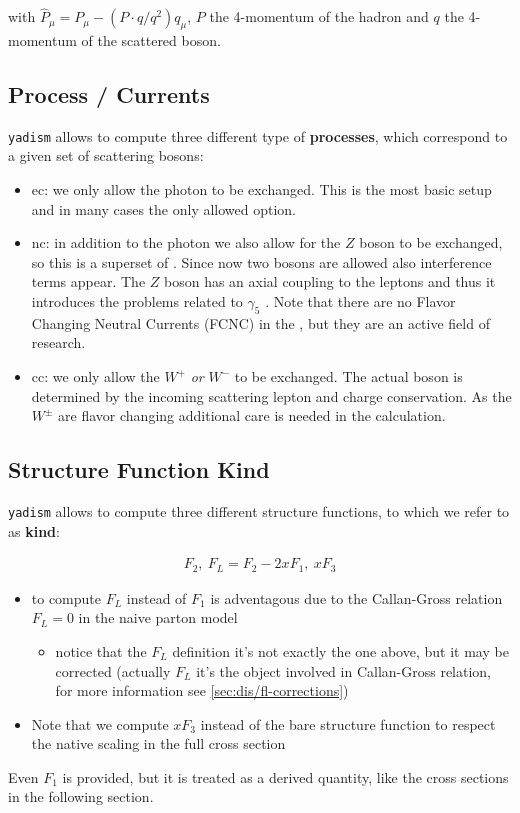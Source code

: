 with $\hat P_\mu = P_\mu - (P\cdot q / q^2) q_\mu$, $P$ the 4-momentum of the
hadron and $q$ the 4-momentum of the scattered boson.

\subsection{Process / Currents}

\texttt{yadism} allows to compute three different type of \textbf{processes}, which correspond to a
given set of scattering bosons:

\begin{itemize}
  \item \acrfull{ec}: we only allow the photon to be exchanged.
    This is the most basic setup and in many cases the only allowed option.
  \item \acrfull{nc}: in addition to the photon we also allow for the
    $Z$ boson to be exchanged, so this is a superset of \ec.
    Since now two bosons are allowed also interference terms appear.
    The $Z$ boson has an axial coupling to the leptons and thus it introduces the
    problems related to $\gamma_5$ \cite{Gnendiger:2017pys}.
    Note that there are no Flavor Changing Neutral Currents (FCNC) in the \sm,
    but they are an active field of research.
  \item \acrfull{cc}: we only allow the $W^+$ \textit{or} $W^-$ to be
    exchanged. The actual boson is determined by the incoming scattering lepton
    and charge conservation. As the $W^\pm$ are flavor changing additional care
    is needed in the calculation.
\end{itemize}


\subsection{Structure Function Kind}

\texttt{yadism} allows to compute three different structure functions, to which we refer to as \textbf{kind}:

\begin{align}
    F_2,~ F_L = F_2 - 2xF_1,~ xF_3
\end{align}

\begin{itemize}
\item to compute $F_L$ instead of $F_1$ is adventagous due to the Callan-Gross relation
  \cite{Callan:1969uq} $F_L=0$ in the naive parton model
  \begin{itemize}
  \item notice that the $F_L$ definition it's not exactly the one above, but it
    may be corrected (actually $F_L$ it's the object involved in Callan-Gross
    relation, for more information see \cref{sec:dis/fl-corrections})
  \end{itemize}
\item Note that we compute $xF_3$ instead of the bare structure function to respect the native
  scaling in the full cross section
\end{itemize}
Even $F_1$ is provided, but it is treated as a derived quantity, like the cross
sections in the following section.
